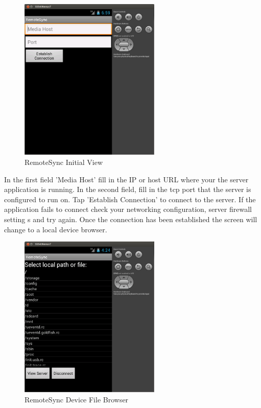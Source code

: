 \documentclass[12pt]{article}
\begin{document}
\begin{figure}[H]
\center
\includegraphics[width=0.6\textwidth]{android-main.png}
\caption{RemoteSync Initial View}
\end{figure}

In the first field 'Media Host' fill in the IP or host URL where your the server application is running. In the second field, fill in the tcp port that the server is configured to run on. Tap 'Establish Connection' to connect to the server. If the application fails to connect check your networking configuration, server firewall setting s and try again. Once the connection has been established the screen will change to a local device browser.

\begin{figure}[H]
\center
\includegraphics[width=0.6\textwidth]{local_browse_view.png}
\caption{RemoteSync Device File Browser}
\end{figure}
\end{document}
